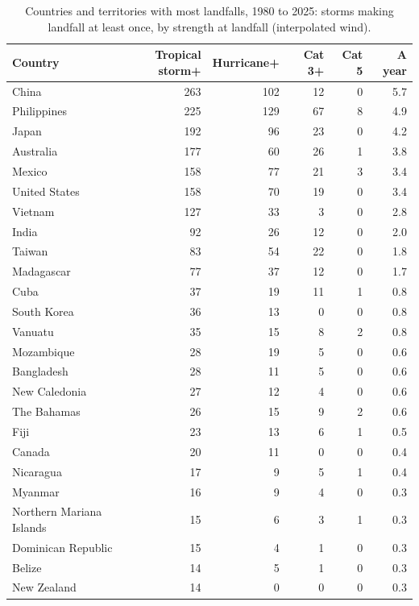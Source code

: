 \documentclass[11pt,a4paper]{article}
\begin{document}
\begin{table}[tbp]\centering\small\caption{Countries and territories with most landfalls, 1980 to 2025: storms making landfall at least once, by strength at landfall (interpolated wind).}\label{tab:countries}\begin{tabular}{lrrrrr}\toprule Country & Tropical storm+ & Hurricane+ & Cat 3+ & Cat 5 & A year\\\midrule
China & 263 & 102 & 12 & 0 & 5.7\\
Philippines & 225 & 129 & 67 & 8 & 4.9\\
Japan & 192 & 96 & 23 & 0 & 4.2\\
Australia & 177 & 60 & 26 & 1 & 3.8\\
Mexico & 158 & 77 & 21 & 3 & 3.4\\
United States & 158 & 70 & 19 & 0 & 3.4\\
Vietnam & 127 & 33 & 3 & 0 & 2.8\\
India & 92 & 26 & 12 & 0 & 2.0\\
Taiwan & 83 & 54 & 22 & 0 & 1.8\\
Madagascar & 77 & 37 & 12 & 0 & 1.7\\
Cuba & 37 & 19 & 11 & 1 & 0.8\\
South Korea & 36 & 13 & 0 & 0 & 0.8\\
Vanuatu & 35 & 15 & 8 & 2 & 0.8\\
Mozambique & 28 & 19 & 5 & 0 & 0.6\\
Bangladesh & 28 & 11 & 5 & 0 & 0.6\\
New Caledonia & 27 & 12 & 4 & 0 & 0.6\\
The Bahamas & 26 & 15 & 9 & 2 & 0.6\\
Fiji & 23 & 13 & 6 & 1 & 0.5\\
Canada & 20 & 11 & 0 & 0 & 0.4\\
Nicaragua & 17 & 9 & 5 & 1 & 0.4\\
Myanmar & 16 & 9 & 4 & 0 & 0.3\\
Northern Mariana Islands & 15 & 6 & 3 & 1 & 0.3\\
Dominican Republic & 15 & 4 & 1 & 0 & 0.3\\
Belize & 14 & 5 & 1 & 0 & 0.3\\
New Zealand & 14 & 0 & 0 & 0 & 0.3\\
\bottomrule\end{tabular}\end{table}
\end{document}
